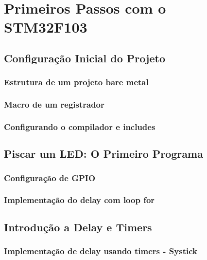 \section{Primeiros Passos com o STM32F103}

\subsection{Configuração Inicial do Projeto}
\subsubsection{Estrutura de um projeto bare metal}
\subsubsection{Macro de um registrador}
\subsubsection{Configurando o compilador e includes}

\subsection{Piscar um LED: O Primeiro Programa}
\subsubsection{Configuração de GPIO}
\subsubsection{Implementação do delay com loop for}

\subsection{Introdução a Delay e Timers}
\subsubsection{Implementação de delay usando timers - Systick}